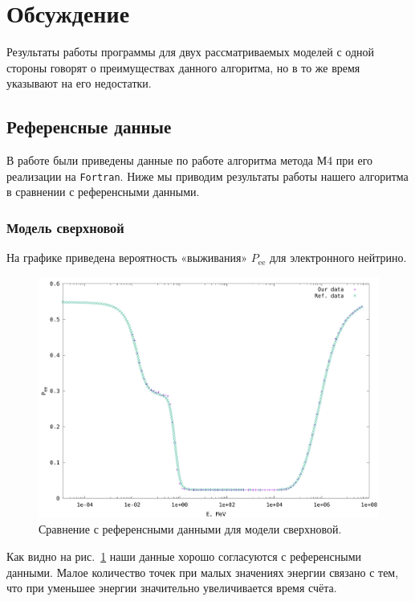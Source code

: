 \documentclass[12pt]{article}
\begin{document}
\section{Обсуждение}

Результаты работы программы для двух рассматриваемых моделей с одной стороны
говорят о преимуществах данного алгоритма, но в то же время указывают на его
недостатки.

\subsection*{Референсные данные}

В работе \cite{casas2016} были приведены данные по работе алгоритма метода М4 при его
реализации на
\verb|Fortran|. %
Ниже мы приводим результаты работы нашего алгоритма в сравнении с референсными
данными.

\subsubsection*{Модель сверхновой}

На графике приведена вероятность «выживания» \(P_{\text{ee}}\) для электронного
нейтрино.

\begin{figure}[H]
  \hspace*{-2em}
  \includegraphics[scale=0.6]{sn_our_vs_ref}
  \caption{\label{fig:1}Сравнение с референсными данными для модели сверхновой.}
\end{figure}

Как видно на рис.~\ref{fig:1} наши данные хорошо согласуются с
референсными данными. Малое количество точек при малых значениях энергии связано с тем, что при уменьшее энергии значительно увеличивается время счёта.
\end{document}
